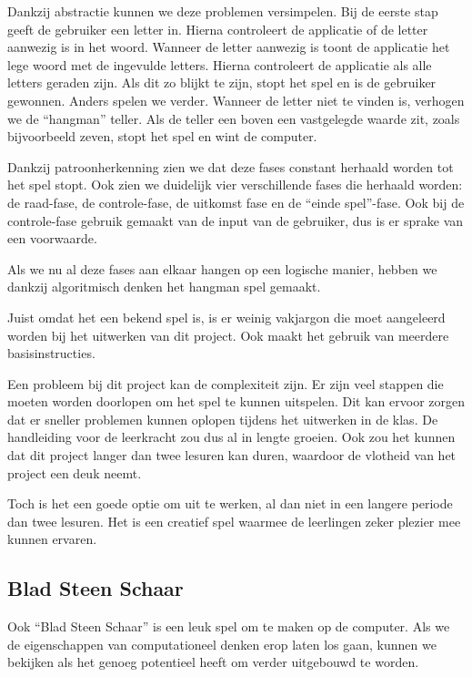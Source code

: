 Dankzij abstractie kunnen we deze problemen versimpelen. Bij de eerste stap geeft de gebruiker een letter in. Hierna controleert de applicatie of de letter aanwezig is in het woord. Wanneer de letter aanwezig is toont de applicatie het lege woord met de ingevulde letters. Hierna controleert de applicatie als alle letters geraden zijn.  Als dit zo blijkt te zijn,  stopt het spel en is de gebruiker gewonnen. Anders spelen we verder. Wanneer de letter niet te vinden is, verhogen we de “hangman” teller. Als de teller een boven een vastgelegde waarde zit, zoals bijvoorbeeld zeven, stopt het spel en wint de computer. 

Dankzij patroonherkenning zien we dat deze fases constant herhaald worden tot het spel stopt. Ook zien we duidelijk vier verschillende fases die herhaald worden: de raad-fase, de controle-fase, de uitkomst fase en de “einde spel”-fase. Ook bij de controle-fase gebruik gemaakt van de input van de gebruiker, dus is er sprake van een voorwaarde.

Als we nu al deze fases aan elkaar hangen op een logische manier, hebben we dankzij algoritmisch denken het hangman spel gemaakt.

Juist omdat het een bekend spel is, is er weinig vakjargon die moet aangeleerd worden bij het uitwerken van dit project. Ook maakt het gebruik van meerdere basisinstructies. 

Een probleem bij dit project kan de complexiteit zijn. Er zijn veel stappen die moeten worden doorlopen om het spel te kunnen uitspelen. Dit kan ervoor zorgen dat er sneller problemen kunnen oplopen tijdens het uitwerken in de klas. De handleiding voor de leerkracht zou dus al in lengte groeien. Ook zou het kunnen dat dit project langer dan twee lesuren kan duren, waardoor de vlotheid van het project een deuk neemt. 

Toch is het een goede optie om uit te werken, al dan niet in een langere periode dan twee lesuren. Het is een creatief spel waarmee de leerlingen zeker plezier mee kunnen ervaren.

\subsection{Blad Steen Schaar}

Ook “Blad Steen Schaar” is een leuk spel om te maken op de computer. Als we de eigenschappen van computationeel denken erop laten los gaan, kunnen we bekijken als het genoeg potentieel heeft om verder uitgebouwd te worden.

